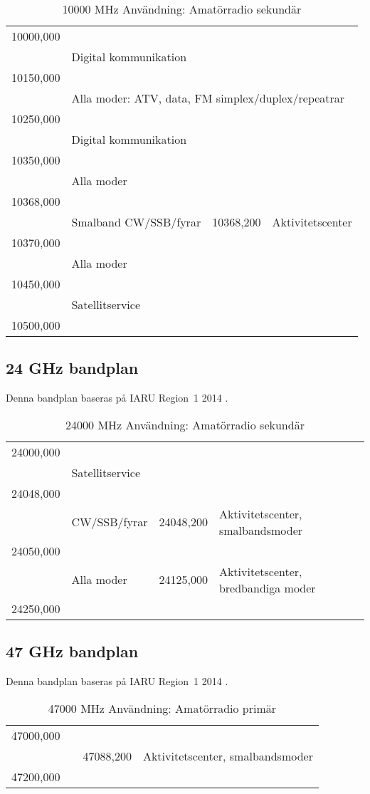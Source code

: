 \setlongtables
\begin{longtable}{llll}
\caption{10000 MHz Användning: Amatörradio sekundär} \\
10000,000 & & & \\
          & \multicolumn{3}{l}{Digital kommunikation} \\
10150,000 & & & \\
          & \multicolumn{3}{l}{Alla moder: ATV, data, FM simplex/duplex/repeatrar} \\
10250,000 & & & \\
          & \multicolumn{3}{l}{Digital kommunikation} \\
10350,000 & & & \\
          & \multicolumn{3}{l}{Alla moder} \\
10368,000 & & & \\
          & Smalband CW/SSB/fyrar & 10368,200 & Aktivitetscenter \\
10370,000 & & & \\
          & \multicolumn{3}{l}{Alla moder} \\
10450,000 & & & \\
          & \multicolumn{3}{l}{Satellitservice} \\
10500,000 & & & \\
\end{longtable}

\subsection{24 GHz bandplan}
\label{24GHzbandplan}
Denna bandplan baseras på IARU Region~1 2014 \cite{IARU1}.

\setlongtables
\begin{longtable}{llll}
\caption{24000 MHz Användning: Amatörradio sekundär} \\
24000,000 & & & \\
          & \multicolumn{3}{l}{Satellitservice} \\
24048,000 & & & \\
          & CW/SSB/fyrar & 24048,200 & Aktivitetscenter, smalbandsmoder \\
24050,000 & & & \\
          & Alla moder   & 24125,000 & Aktivitetscenter, bredbandiga moder \\
24250,000 & & & \\
\end{longtable}

\subsection{47 GHz bandplan}
\label{47GHzbandplan}
Denna bandplan baseras på IARU Region~1 2014 \cite{IARU1}.

\setlongtables
\begin{longtable}{llll}
\caption{47000 MHz Användning: Amatörradio primär} \\
47000,000 & & & \\
          & & 47088,200 & Aktivitetscenter, smalbandsmoder \\
47200,000 & & & \\
\end{longtable}
